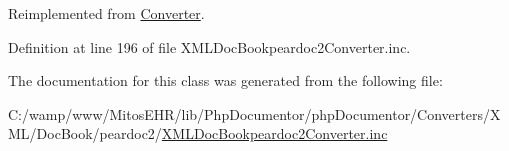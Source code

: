 \-Reimplemented from \hyperlink{class_converter_a9e8e3182b20bb595bfe9186d97b57bb2}{\-Converter}.



\-Definition at line 196 of file \-X\-M\-L\-Doc\-Bookpeardoc2\-Converter.\-inc.



\-The documentation for this class was generated from the following file\-:\begin{DoxyCompactItemize}
\item 
\-C\-:/wamp/www/\-Mitos\-E\-H\-R/lib/\-Php\-Documentor/php\-Documentor/\-Converters/\-X\-M\-L/\-Doc\-Book/peardoc2/\hyperlink{_x_m_l_doc_bookpeardoc2_converter_8inc}{\-X\-M\-L\-Doc\-Bookpeardoc2\-Converter.\-inc}\end{DoxyCompactItemize}
